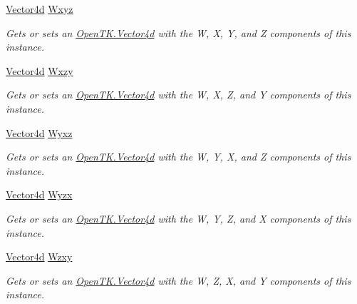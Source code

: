 \begin{DoxyCompactItemize}
\hyperlink{struct_open_t_k_1_1_vector4d}{Vector4d} \hyperlink{struct_open_t_k_1_1_vector4d_aca45279533fcd6f06940311f4162a0b1}{Wxyz}
\begin{DoxyCompactList}\small\item\em Gets or sets an \hyperlink{struct_open_t_k_1_1_vector4d}{Open\-T\-K.\-Vector4d} with the W, X, Y, and Z components of this instance. \end{DoxyCompactList}\item 
\hyperlink{struct_open_t_k_1_1_vector4d}{Vector4d} \hyperlink{struct_open_t_k_1_1_vector4d_aeb143492351bd2ef9d7cb4526a6db7cf}{Wxzy}
\begin{DoxyCompactList}\small\item\em Gets or sets an \hyperlink{struct_open_t_k_1_1_vector4d}{Open\-T\-K.\-Vector4d} with the W, X, Z, and Y components of this instance. \end{DoxyCompactList}\item 
\hyperlink{struct_open_t_k_1_1_vector4d}{Vector4d} \hyperlink{struct_open_t_k_1_1_vector4d_a765866b8f9b1ee679a967fc23f16e2ef}{Wyxz}
\begin{DoxyCompactList}\small\item\em Gets or sets an \hyperlink{struct_open_t_k_1_1_vector4d}{Open\-T\-K.\-Vector4d} with the W, Y, X, and Z components of this instance. \end{DoxyCompactList}\item 
\hyperlink{struct_open_t_k_1_1_vector4d}{Vector4d} \hyperlink{struct_open_t_k_1_1_vector4d_a2e7ba0af1a49014cb55aba88d227dcbf}{Wyzx}
\begin{DoxyCompactList}\small\item\em Gets or sets an \hyperlink{struct_open_t_k_1_1_vector4d}{Open\-T\-K.\-Vector4d} with the W, Y, Z, and X components of this instance. \end{DoxyCompactList}\item 
\hyperlink{struct_open_t_k_1_1_vector4d}{Vector4d} \hyperlink{struct_open_t_k_1_1_vector4d_aa7c1433815b91e99ded46d981cdb358b}{Wzxy}
\begin{DoxyCompactList}\small\item\em Gets or sets an \hyperlink{struct_open_t_k_1_1_vector4d}{Open\-T\-K.\-Vector4d} with the W, Z, X, and Y components of this instance. \end{DoxyCompactList}\item 

\end{DoxyCompactItemize}
